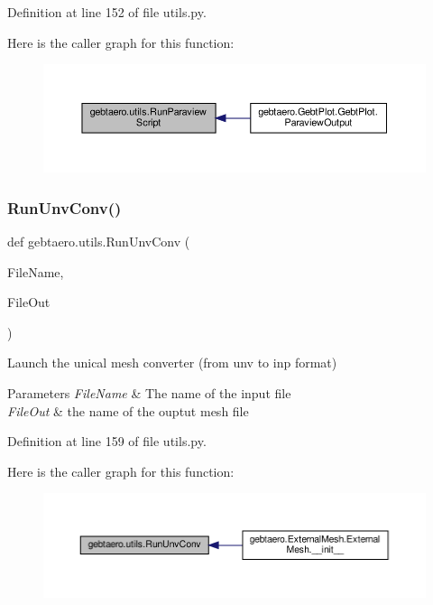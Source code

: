 Definition at line 152 of file utils.\+py.

Here is the caller graph for this function\+:
\nopagebreak
\begin{figure}[H]
\begin{center}
\leavevmode
\includegraphics[width=350pt]{namespacegebtaero_1_1utils_a248e0abbec4c02bcb7e75fea0f400c25_icgraph}
\end{center}
\end{figure}
\mbox{\label{namespacegebtaero_1_1utils_ae04f5967428b15a9dc2971f6a2396938}} 
\subsubsection{\texorpdfstring{Run\+Unv\+Conv()}{RunUnvConv()}}
{\footnotesize\ttfamily def gebtaero.\+utils.\+Run\+Unv\+Conv (\begin{DoxyParamCaption}\item[{}]{File\+Name,  }\item[{}]{File\+Out }\end{DoxyParamCaption})}



Launch the unical mesh converter (from unv to inp format) 


\begin{DoxyParams}{Parameters}
{\em File\+Name} & The name of the input file \\
\hline
{\em File\+Out} & the name of the ouptut mesh file \\
\hline
\end{DoxyParams}


Definition at line 159 of file utils.\+py.

Here is the caller graph for this function\+:
\nopagebreak
\begin{figure}[H]
\begin{center}
\leavevmode
\includegraphics[width=350pt]{namespacegebtaero_1_1utils_ae04f5967428b15a9dc2971f6a2396938_icgraph}
\end{center}
\end{figure}
